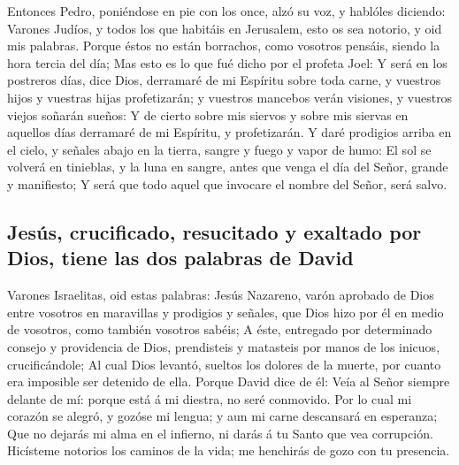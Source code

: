  Entonces Pedro, poniéndose en pie con los once, alzó su
voz, y hablóles diciendo: Varones Judíos, y todos los que habitáis en
Jerusalem, esto os sea notorio, y oid mis palabras.  Porque
éstos no están borrachos, como vosotros pensáis, siendo la hora tercia
del día;  Mas esto es lo que fué dicho por el profeta Joel:
 Y será en los postreros días, dice Dios, derramaré de mi
Espíritu sobre toda carne, y vuestros hijos y vuestras hijas
profetizarán; y vuestros mancebos verán visiones, y vuestros viejos
soñarán sueños:  Y de cierto sobre mis siervos y sobre mis
siervas en aquellos días derramaré de mi Espíritu, y profetizarán.
 Y daré prodigios arriba en el cielo, y señales abajo en la
tierra, sangre y fuego y vapor de humo:  El sol se volverá
en tinieblas, y la luna en sangre, antes que venga el día del Señor,
grande y manifiesto;  Y será que todo aquel que invocare el
nombre del Señor, será salvo.

\hypertarget{jesuxfas-crucificado-resucitado-y-exaltado-por-dios-tiene-las-dos-palabras-de-david}{%
\subsection{Jesús, crucificado, resucitado y exaltado por Dios, tiene
las dos palabras de
David}\label{jesuxfas-crucificado-resucitado-y-exaltado-por-dios-tiene-las-dos-palabras-de-david}}

 Varones Israelitas, oid estas palabras: Jesús Nazareno,
varón aprobado de Dios entre vosotros en maravillas y prodigios y
señales, que Dios hizo por él en medio de vosotros, como también
vosotros sabéis;  A éste, entregado por determinado consejo
y providencia de Dios, prendisteis y matasteis por manos de los inicuos,
crucificándole;  Al cual Dios levantó, sueltos los dolores
de la muerte, por cuanto era imposible ser detenido de ella.
 Porque David dice de él: Veía al Señor siempre delante de
mí: porque está á mi diestra, no seré conmovido.  Por lo
cual mi corazón se alegró, y gozóse mi lengua; y aun mi carne descansará
en esperanza;  Que no dejarás mi alma en el infierno, ni
darás á tu Santo que vea corrupción.  Hicísteme notorios
los caminos de la vida; me henchirás de gozo con tu presencia.

